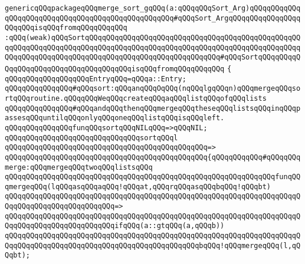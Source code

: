 \newline
\verb|genericqQQqpackageqQQqmerge_sort_gqQQq(a:qQQqqQQqSort_Arg)qQQqqQQqqQQqqQQqqQQqqQQqqQQqqQQqqQQqqQQqqQQqqQQqqQQq#qQQqSort_ArgqQQqqQQqqQQqqQQqqQQqqQQqisqQQqfromqQQqqQQqqQQq|\newline
\newline
\verb|:qQQq(weak)qQQqSortqQQqqQQqqQQqqQQqqQQqqQQqqQQqqQQqqQQqqQQqqQQqqQQqqQQqqQQqqQQqqQQqqQQqqQQqqQQqqQQqqQQqqQQqqQQqqQQqqQQqqQQqqQQqqQQqqQQqqQQqqQQqqQQqqQQqqQQqqQQqqQQqqQQqqQQqqQQqqQQqqQQqqQQqqQQq#qQQqSortqQQqqQQqqQQqqQQqqQQqqQQqqQQqqQQqqQQqqQQqisqQQqfromqQQqqQQqqQQq|\newline
\newline
\verb|{|\newline
\verb|qQQqqQQqqQQqqQQqqQQqEntryqQQq=qQQqa::Entry;|\newline
\newline
\verb|qQQqqQQqqQQqqQQq#qQQqsort:qQQqanqQQqOqQQq(nqQQqlgqQQqn)qQQqmergeqQQqsortqQQqroutine.qQQqqQQqWeqQQqcreateqQQqaqQQqlistqQQqofqQQqlists|\newline
\verb|qQQqqQQqqQQqqQQq#qQQqandqQQqthenqQQqmergeqQQqtheseqQQqlistsqQQqinqQQqpassesqQQquntilqQQqonlyqQQqoneqQQqlistqQQqisqQQqleft.|\newline
\newline
\verb|qQQqqQQqqQQqqQQqfunqQQqsortqQQqNILqQQq=>qQQqNIL;|\newline
\newline
\verb|qQQqqQQqqQQqqQQqqQQqqQQqqQQqqQQqsortqQQql|\newline
\verb|qQQqqQQqqQQqqQQqqQQqqQQqqQQqqQQqqQQqqQQqqQQqqQQq=>|\newline
\verb|qQQqqQQqqQQqqQQqqQQqqQQqqQQqqQQqqQQqqQQqqQQqqQQq{qQQqqQQqqQQq#qQQqqQQqmerge:qQQqmergeqQQqtwoqQQqlistsqQQq|\newline
\newline
\verb|qQQqqQQqqQQqqQQqqQQqqQQqqQQqqQQqqQQqqQQqqQQqqQQqqQQqqQQqqQQqqQQqfunqQQqmergeqQQq(lqQQqasqQQqaqQQq!qQQqat,qQQqrqQQqasqQQqbqQQq!qQQqbt)|\newline
\verb|qQQqqQQqqQQqqQQqqQQqqQQqqQQqqQQqqQQqqQQqqQQqqQQqqQQqqQQqqQQqqQQqqQQqqQQqqQQqqQQqqQQqqQQqqQQqqQQq=>|\newline
\verb|qQQqqQQqqQQqqQQqqQQqqQQqqQQqqQQqqQQqqQQqqQQqqQQqqQQqqQQqqQQqqQQqqQQqqQQqqQQqqQQqqQQqqQQqqQQqqQQqifqQQq(a::gtqQQq(a,qQQqb))|\newline
\verb|qQQqqQQqqQQqqQQqqQQqqQQqqQQqqQQqqQQqqQQqqQQqqQQqqQQqqQQqqQQqqQQqqQQqqQQqqQQqqQQqqQQqqQQqqQQqqQQqqQQqqQQqqQQqqQQqqQQqbqQQq!qQQqmergeqQQq(l,qQQqbt);|\newline
